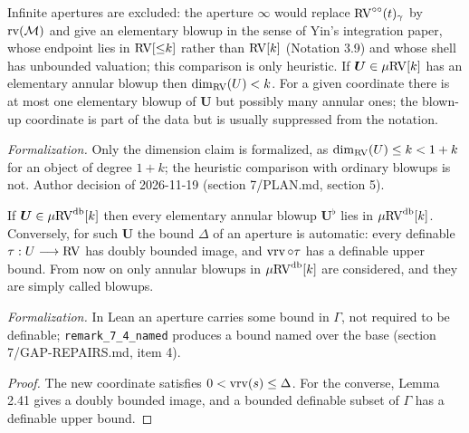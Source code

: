 \setcounter{theorem}{2}
\begin{remark}
\label{s7-infinite-apertures}
\leanok
{}
Infinite apertures are excluded: the aperture $\infty$ would replace $\mathrm{RV}^{\circ\circ}(t)_\gamma$ by $\operatorname{rv}(\mathcal{M})$ and give an elementary blowup in the sense of Yin's integration paper, whose endpoint lies in $\mathrm{RV}[{\leq}k]$ rather than $\mathrm{RV}[k]$ (Notation 3.9) and whose shell has unbounded valuation; this comparison is only heuristic. If $\boldsymbol{U} \in \mu\mathrm{RV}[k]$ has an elementary annular blowup then $\dim_{\mathrm{RV}}(U) < k$. For a given coordinate there is at most one elementary blowup of $\boldsymbol{U}$ but possibly many annular ones; the blown-up coordinate is part of the data but is usually suppressed from the notation.

\emph{Formalization.} Only the dimension claim is formalized, as $\dim_{\mathrm{RV}}(U) \leq k < 1 + k$ for an object of degree $1 + k$; the heuristic comparison with ordinary blowups is not. Author decision of 2026-11-19 (section 7/PLAN.md, section 5).
\end{remark}

\setcounter{theorem}{3}
\begin{remark}
\label{db-blowup-bound}
\leanok
{}
If $\boldsymbol{U} \in \mu\mathrm{RV}^{\operatorname{db}}[k]$ then every elementary annular blowup $\boldsymbol{U}^\flat$ lies in $\mu\mathrm{RV}^{\operatorname{db}}[k]$. Conversely, for such $\boldsymbol{U}$ the bound $\Delta$ of an aperture is automatic: every definable $\tau : U \longrightarrow \mathrm{RV}$ has doubly bounded image, and $\operatorname{vrv} \circ \tau$ has a definable upper bound. From now on only annular blowups in $\mu\mathrm{RV}^{\operatorname{db}}[k]$ are considered, and they are simply called blowups.

\emph{Formalization.} In Lean an aperture carries some bound in $\Gamma$, not required to be definable; \texttt{remark\_7\_4\_named} produces a bound named over the base (section 7/GAP-REPAIRS.md, item 4).
\end{remark}

\begin{proof}
\leanok
The new coordinate satisfies $0 < \operatorname{vrv}(s) \leq \Delta$. For the converse, Lemma 2.41 gives a doubly bounded image, and a bounded definable subset of $\Gamma$ has a definable upper bound.
\end{proof}

